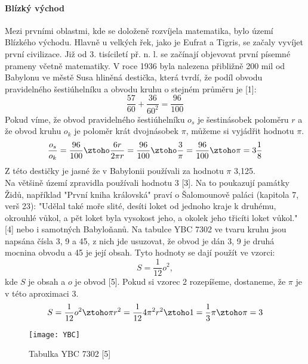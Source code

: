 \documentclass[rocnikovka]{gzwroc} %
\begin{document}
\paragraph{Blízký východ}
Mezi prvními oblastmi, kde se doloženě rozvíjela matematika, bylo území Blízkého východu. Hlavně u velkých řek, jako je Eufrat a Tigris, se začaly vyvíjet první civilizace. Již od 3. tisíciletí př. n. l. se začínají objevovat první písemné prameny včetně matematiky. 
V roce 1936 byla nalezena přibližně 200 mil od Babylonu ve městě Susa hliněná destička, která tvrdí, že podíl obvodu pravidelného šestiúhelníku a obvodu kruhu o stejném průměru je [1]:
$$
\frac{57}{60}+\frac{36}{60^2}=\frac{96}{100}
$$
Pokud víme, že obvod pravidelného šestiúhelníku $o_s$ je šestinásobek poloměru $r$ a že obvod kruhu $o_k$ je poloměr krát dvojnásobek $\pi$, můžeme si vyjádřit hodnotu $\pi$.
\begin{equation}
\frac{o_s}{o_k}=\frac{96}{100} \ztoho \frac{6r}{2\pi r}=\frac{96}{100} \ztoho \frac{3}{\pi}=\frac{96}{100} \ztoho\pi=3\frac{1}{8}
\end{equation}
Z této destičky je jasné že v Babylonii používali za hodnotu $\pi$ 3,125.\\
Na většině území zpravidla používali hodnotu 3 [3]. Na to poukazují památky Židů, například "První kniha královská" praví o Šalomounově paláci (kapitola 7, verš 23): "Udělal také moře slité, desíti loket od jednoho kraje k druhému, okrouhlé vůkol, a pět loket byla vysokost jeho, a okolek jeho třicíti loket vůkol." [4] nebo i samotných Babyloňanů. Na tabulce YBC 7302 ve tvaru kruhu jsou napsána čísla 3, 9 a 45, z nich jde usuzovat, že obvod je dán 3, 9 je druhá mocnina obvodu a 45 je její obsah. Tyto hodnoty se dají použít ve vzorci:
\begin{equation}
S=\frac{1}{12}o^2,
\end{equation}
kde $S$ je obsah a $o$ je obvod [5]. Pokud si vzorec 2 rozepíšeme, dostaneme, že $\pi$ je v této aproximaci 3.
$$
S=\frac{1}{12}o^2 \ztoho \pi r^2=\frac{1}{12}4\pi^2r^2 \ztoho 1=\frac{1}{3}\pi \ztoho \pi=3
$$
\begin{figure}[!ht]
\texttt{[image: YBC]}
\caption{Tabulka YBC 7302 [5]}
\label{fig:kruh}
\end{figure}
\end{document}
